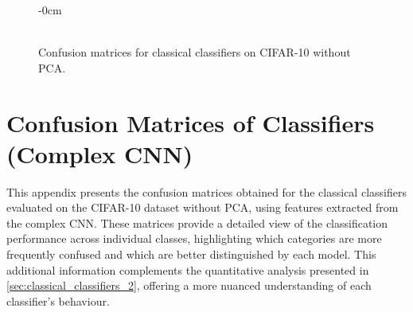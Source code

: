 \documentclass[journal,article,submit,pdftex,moreauthors]{Definitions/mdpi}
\begin{document}
\begin{figure}[H]
\begin{adjustwidth}{-\extralength}{0cm} %
\centering
{}\hfill
{}\\[1em]
\hfill
{}\\[1em]
\end{adjustwidth}
\caption{Confusion matrices for classical classifiers on CIFAR-10 without PCA.\label{fig:confmats_cifar10_sem_pca2}}
\end{figure}



\clearpage
\section[\appendixname~\thesection]{Confusion Matrices of Classifiers (Complex CNN)}
\label{ap:ap2}

This appendix presents the confusion matrices obtained for the classical classifiers evaluated on the CIFAR-10 dataset without PCA, using features extracted from the complex CNN. These matrices provide a detailed view of the classification performance across individual classes, highlighting which categories are more frequently confused and which are better distinguished by each model. This additional information complements the quantitative analysis presented in \autoref{sec:classical_classifiers_2}, offering a more nuanced understanding of each classifier’s behaviour.
\end{document}
